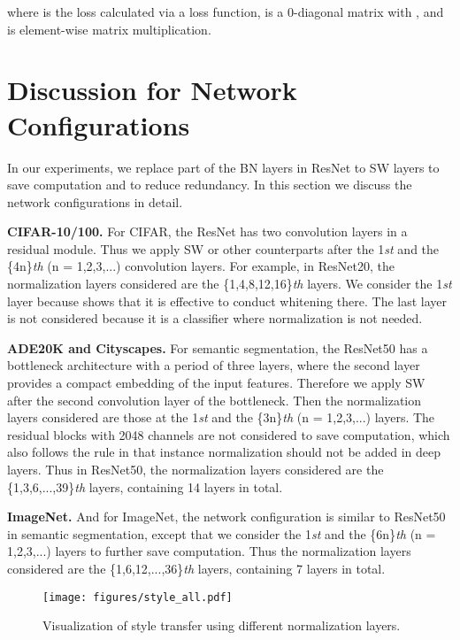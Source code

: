 \documentclass[10pt,twocolumn,letterpaper]{article}
\begin{document}
where  is the loss calculated via a loss function,  is a 0-diagonal matrix with , and  is element-wise matrix multiplication.


\section{Discussion for Network Configurations}

In our experiments, we replace part of the BN layers in ResNet to SW layers to save computation and to reduce redundancy.
In this section we discuss the network configurations in detail.

\noindent\textbf{CIFAR-10/100.}
For CIFAR, the ResNet has two convolution layers in a residual module. 
Thus we apply SW or other counterparts after the 1\textit{st} and the \{4n\}\textit{th} (n = 1,2,3,...) convolution layers.
For example, in ResNet20, the normalization layers considered are the \{1,4,8,12,16\}\textit{th} layers.
We consider the 1\textit{st} layer because \cite{lei2018decorrelated} shows that it is effective to conduct whitening there.
The last layer is not considered because it is a classifier where normalization is not needed.

\noindent\textbf{ADE20K and Cityscapes.}
For semantic segmentation, the ResNet50 has a bottleneck architecture with a period of three layers, where the second layer provides a compact embedding of the input features.
Therefore we apply SW after the second convolution layer of the bottleneck.
Then the normalization layers considered are those at the 1\textit{st} and the \{3n\}\textit{th} (n = 1,2,3,...) layers.
The residual blocks with 2048 channels are not considered to save computation, which also follows the rule in \cite{pan2018two} that instance normalization should not be added in deep layers.
Thus in ResNet50, the normalization layers considered are the \{1,3,6,...,39\}\textit{th} layers, containing 14 layers in total.

\noindent\textbf{ImageNet.}
And for ImageNet, the network configuration is similar to ResNet50 in semantic segmentation, except that we consider the 1\textit{st} and the \{6n\}\textit{th} (n = 1,2,3,...) layers to further save computation.
Thus the normalization layers considered are the \{1,6,12,...,36\}\textit{th} layers, containing 7 layers in total.


\begin{figure*}[t!]
	\centering
	\texttt{[image: figures/style\_all.pdf]}
	\caption{Visualization of style transfer using different normalization layers.}
	\label{style}
	\vspace{-6pt}
\end{figure*}
\end{document}
